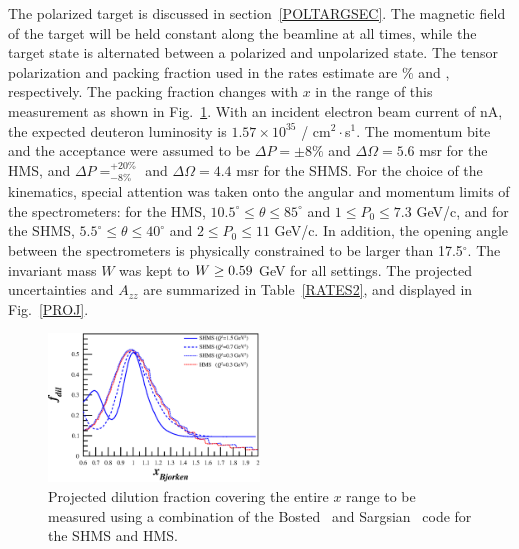 The polarized \TARGET target is discussed in section~\ref{POLTARGSEC}.  The magnetic field of the target will be held constant along the beamline at all times, while the target state is alternated between a polarized and unpolarized state.
The tensor polarization and packing fraction used in the rates estimate are \PZZ\% and \PF, respectively. 
The packing fraction changes with $x$ in the range of this measurement as shown in Fig.~\ref{fdil_plot}.
With an incident
electron beam current of \CURRENT nA, the
expected deuteron luminosity is $1.57\times 10^{35}$ / cm$^2\cdot$s$^1$. The momentum bite and the acceptance
were assumed to be $\Delta P = \pm 8\%$ and $\Delta\Omega = 5.6$ msr for the HMS, and $\Delta P= ^{+20\%}_{-8\%}$ 
and $\Delta\Omega =4.4$ msr for the SHMS. 
%
For the choice of the kinematics,
special attention was taken onto the angular and momentum limits of the spectrometers: for the
HMS, $10.5^{\circ} \le \theta \le 85^{\circ}$ and $1 \le P_0 \le 7.3$ GeV/c, and for the SHMS,
$5.5^{\circ} \le \theta \le 40^{\circ}$ and $2 \le P_0 \le 11$ GeV/c. In addition, the
opening angle between the spectrometers is physically constrained to be larger than 17.5$^{\circ}$.
The invariant mass $W$ was kept to $W \ge 0.59$ GeV for all settings.
The projected 
uncertainties and $A_{zz}$
are summarized in Table~\ref{RATES2}, and displayed in
Fig.~\ref{PROJ}.  

\begin{figure}
\begin{center}
\includegraphics[width=0.5\textwidth]{figs/Pzz_30_fdil_all.eps} 
\caption{\label{fdil_plot}Projected dilution fraction covering the entire $x$ range to be measured using a combination of the Bosted~\cite{Bosted:2012qc} and Sargsian~\cite{needed} code for the SHMS and HMS.}
\end{center}
\end{figure}


